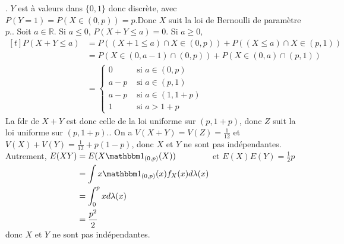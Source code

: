 \documentclass{report}
\begin{document}
\subsection{} \noindent{}\\ 
\\ 
\\
. $Y$ est à valeurs dans $\{0,1\}$ donc discrète, avec $P(Y=1)=P(X\in (0,p))=p$.\newline Donc $X$ suit la loi de Bernoulli de paramètre $p$.\newline {}. Soit $a\in \mathbb R$. Si $a\leq 0$, $P(X+Y\leq a)=0$. Si $a\geq 0$, $$\begin{aligned}[t]
P(X+Y\leq a) &= P((X+1\leq a) \cap X\in (0,p)) + P((X\leq a)\cap X\in (p,1))\\
&= P(X\in (0,a-1)\cap (0,p)) + P(X\in (0,a) \cap (p,1))\\
&= \begin{cases}
0 & \text{ si } a\in (0,p)\\
a-p & \text{ si } a\in (p,1)\\
a-p & \text{ si } a\in (1,1+p)\\
1 & \text{ si } a>1+p
\end{cases}
\end{aligned}$$
La fdr de $X+Y$ est donc celle de la loi uniforme sur $(p,1+p)$, donc $Z$ suit la loi uniforme sur $(p,1+p)$.\newline {}. On a $V(X+Y)=V(Z)=\frac{1}{12}$ et $V(X)+V(Y)=\frac{1}{12} + p(1-p)$, donc $X$ et $Y$ ne sont pas indépendantes. \newline \newline
Autrement, $\begin{aligned}[t] E(XY)&=E(X \mathbbm 1_{(0,p)}(X)) \\
&= \int x\mathbbm 1_{(0,p)}(x) f_X(x) d\lambda(x) \\
&= \int_0^p x d\lambda(x) \\
&= \frac{p^2}{2}
\end{aligned}$ \newline
et $E(X)E(Y) = \frac{1}{2} p$ donc $X$ et $Y$ ne sont pas indépendantes.
\end{document}
